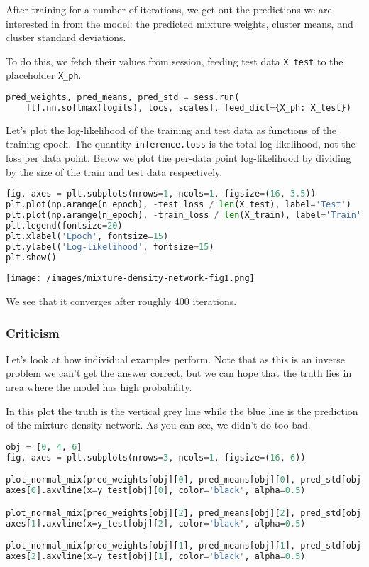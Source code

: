 After training for a number of iterations, we get out the predictions
we are interested in from the model: the predicted mixture weights,
cluster means, and cluster standard deviations.

To do this, we fetch their values from session, feeding test data
\texttt{X\_test} to the placeholder \texttt{X\_ph}.

\begin{lstlisting}[language=Python]
pred_weights, pred_means, pred_std = sess.run(
    [tf.nn.softmax(logits), locs, scales], feed_dict={X_ph: X_test})
\end{lstlisting}

Let's plot the log-likelihood of the training and test data as
functions of the training epoch. The quantity \texttt{inference.loss}
is the total log-likelihood, not the loss per data point. Below we
plot the per-data point log-likelihood by dividing by the size of the
train and test data respectively.

\begin{lstlisting}[language=Python]
fig, axes = plt.subplots(nrows=1, ncols=1, figsize=(16, 3.5))
plt.plot(np.arange(n_epoch), -test_loss / len(X_test), label='Test')
plt.plot(np.arange(n_epoch), -train_loss / len(X_train), label='Train')
plt.legend(fontsize=20)
plt.xlabel('Epoch', fontsize=15)
plt.ylabel('Log-likelihood', fontsize=15)
plt.show()
\end{lstlisting}

\texttt{[image: /images/mixture-density-network-fig1.png]}

We see that it converges after roughly 400 iterations.

\subsubsection{Criticism}

Let's look at how individual examples perform. Note that as this is an
inverse problem we can't get the answer correct, but we can hope that
the truth lies in area where the model has high probability.

In this plot the truth is the vertical grey line while the blue line
is the prediction of the mixture density network. As you can see, we
didn't do too bad.

\begin{lstlisting}[language=Python]
obj = [0, 4, 6]
fig, axes = plt.subplots(nrows=3, ncols=1, figsize=(16, 6))

plot_normal_mix(pred_weights[obj][0], pred_means[obj][0], pred_std[obj][0], axes[0], comp=False)
axes[0].axvline(x=y_test[obj][0], color='black', alpha=0.5)

plot_normal_mix(pred_weights[obj][2], pred_means[obj][2], pred_std[obj][2], axes[1], comp=False)
axes[1].axvline(x=y_test[obj][2], color='black', alpha=0.5)

plot_normal_mix(pred_weights[obj][1], pred_means[obj][1], pred_std[obj][1], axes[2], comp=False)
axes[2].axvline(x=y_test[obj][1], color='black', alpha=0.5)
\end{lstlisting}

